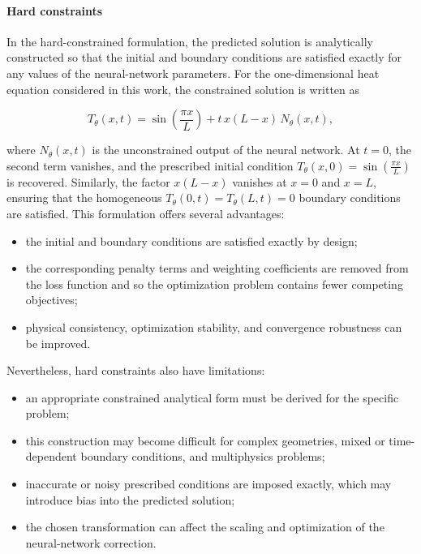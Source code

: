 \paragraph{Hard constraints}

In the hard-constrained formulation, the predicted solution is analytically
constructed so that the initial and boundary conditions are satisfied exactly
for any values of the neural-network parameters. For the one-dimensional heat
equation considered in this work, the constrained solution is written as

\begin{equation}
T_{\theta}(x,t)
=
\sin\left(\frac{\pi x}{L}\right)
+
t\,x(L-x)\,N_{\theta}(x,t),
\end{equation}

where $N_{\theta}(x,t)$ is the unconstrained output of the neural network. At
$t=0$, the second term vanishes, and the prescribed initial condition $T_{\theta}(x,0) = \sin\left(\frac{\pi x}{L}\right)$ is
recovered. Similarly, the factor $x(L-x)$ vanishes at $x=0$ and $x=L$, ensuring
that the homogeneous $T_{\theta}(0,t) = T_{\theta}(L,t) = 0$ boundary conditions are satisfied. This formulation offers several advantages:

\begin{itemize}
    \item the initial and boundary conditions are satisfied exactly by design;
    \item the corresponding penalty terms and weighting coefficients are removed
    from the loss function and so the optimization problem contains fewer competing objectives;
    \item physical consistency, optimization stability, and convergence robustness
    can be improved.
\end{itemize}

Nevertheless, hard constraints also have limitations:

\begin{itemize}
    \item an appropriate constrained analytical form must be derived for the
    specific problem;
    \item this construction may become difficult for complex geometries, mixed or
    time-dependent boundary conditions, and multiphysics problems;
    \item inaccurate or noisy prescribed conditions are imposed exactly, which may
    introduce bias into the predicted solution;
    \item the chosen transformation can affect the scaling and optimization of the
    neural-network correction.
\end{itemize}

